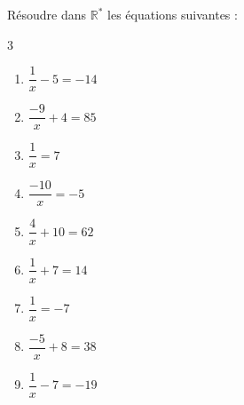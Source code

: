 {%
\begin{Exercice}
Résoudre dans $\mathbb{R}^*$ les équations suivantes :
\vspace{-0.5cm}
\begin{multicols}{3}
\begin{enumerate}[itemsep=1em]
	\item \begin{minipage}[t]{\linewidth}$\dfrac{1}{x}-5=-14$\\\end{minipage}
	\item \begin{minipage}[t]{\linewidth}$\dfrac{-9}{x}+4=85$\\\end{minipage}
	\item \begin{minipage}[t]{\linewidth}$\dfrac{1}{x}=7$\\\end{minipage}
	\item \begin{minipage}[t]{\linewidth}$\dfrac{-10}{x}=-5$\\\end{minipage}
	\item \begin{minipage}[t]{\linewidth}$\dfrac{4}{x}+10=62$\\\end{minipage}
	\item \begin{minipage}[t]{\linewidth}$\dfrac{1}{x}+7=14$\\\end{minipage}
	\item \begin{minipage}[t]{\linewidth}$\dfrac{1}{x}=-7$\\\end{minipage}
	\item \begin{minipage}[t]{\linewidth}$\dfrac{-5}{x}+8=38$\\\end{minipage}
	\item \begin{minipage}[t]{\linewidth}$\dfrac{1}{x}-7=-19$\\\end{minipage}
\end{enumerate}
\end{multicols}
\end{Exercice}



}
